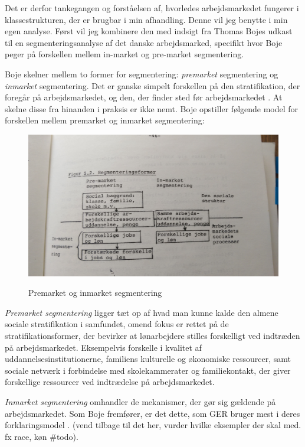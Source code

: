 Det er derfor tankegangen og forståelsen af, hvorledes arbejdsmarkedet fungerer i klassestrukturen, der er brugbar i min afhandling. Denne vil jeg benytte i min egen analyse. Først vil jeg kombinere den med indsigt fra Thomas Bojes udkast til en segmenteringsanalyse af det danske arbejdsmarked, specifikt hvor Boje peger på forskellen mellem in-market og pre-market segmentering.

Boje skelner mellem to former for segmentering: \emph{premarket} segmentering og \emph{inmarket} segmentering. Det er ganske simpelt forskellen på den stratifikation, der foregår på arbejdsmarkedet, og den, der finder sted før arbejdsmarkedet \parencite[46]{Boje1985}. At skelne disse fra hinanden i praksis er ikke nemt. Boje opstiller følgende model for forskellen mellem premarket og inmarket segmentering:
%
   \begin{figure}[H]
   \begin{centering}
   	\caption{Premarket og inmarket segmentering}
   	\includegraphics[width=\textwidth]{fig/Boje_premarket_inmarket.jpg}
   	\label{fig_premarketinmarket}
   \end{centering}
   \end{figure}   
%

\emph{Premarket segmentering} ligger tæt op af hvad man kunne kalde den almene sociale stratifikation i samfundet, omend fokus er rettet på de stratifikationsformer, der bevirker at lønarbejdere stilles forskelligt ved indtræden på arbejdsmarkedet. 
Eksempelvis forskelle i kvalitet af uddannelsesinstitutionerne, familiens kulturelle og økonomiske ressourcer, samt  sociale netværk i forbindelse med skolekammerater og familiekontakt, der giver forskellige ressourcer ved indtrædelse på arbejdsmarkedet. 

\emph{Inmarket segmentering} omhandler de mekanismer, der gør sig gældende på arbejdsmarkedet. Som Boje fremfører, er det dette, som GER bruger mest i deres forklaringsmodel \parencite[46]{Boje1985}.  (vend tilbage til det her, vurder hvilke eksempler der skal med. fx race, køn \#todo).

